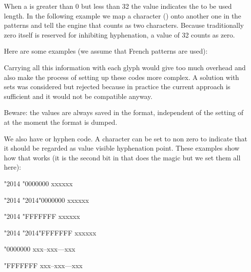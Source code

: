 When a \type {\hjcode} is greater than 0 but less than 32 the value indicates the
to be used length. In the following example we map a character () onto
another one in the patterns and tell the engine that  counts as two
characters. Because traditionally zero itself is reserved for inhibiting
hyphenation, a value of 32 counts as zero.

Here are some examples (we assume that French patterns are used):

\starttabulate[||||]
\NC                                  \NC {} \NC {} \NC \NR
\NC {}              \NC {} \NC {} \NC \NR
\NC {}           \NC {} \NC {} \NC \NR
\NC {}           \NC {} \NC {}  \NC \NR
\NC {}               \NC {} \NC {} \NC \NR
\NC {} \NC {} \NC {}  \NC \NR
\stoptabulate

Carrying all this information with each glyph would give too much overhead and
also make the process of setting up these codes more complex. A solution with
\type {\hjcode} sets was considered but rejected because in practice the current
approach is sufficient and it would not be compatible anyway.

Beware: the values are always saved in the format, independent of the setting
of \type {\savinghyphcodes} at the moment the format is dumped.

We also have \type {\hccode} or hyphen code. A character can be set to non zero
to indicate that it should be regarded as value visible hyphenation point. These
examples show how that works (it is the second bit in \type {\hyphenationmode}
that does the magic but we set them all here):

\startbuffer
{\hsize 1mm \hccode"2014 \zerocount  \hyphenationmode "0000000 xxx\emdash xxx \par}
{\hsize 1mm \hccode"2014 "2014\relax \hyphenationmode "0000000 xxx\emdash xxx \par}

{\hsize 1mm \hccode"2014 \zerocount  \hyphenationmode "FFFFFFF xxx\emdash xxx \par}
{\hsize 1mm \hccode"2014 "2014\relax \hyphenationmode "FFFFFFF xxx\emdash xxx \par}

{\hyphenationmode "0000000 xxx--xxx---xxx \par}
{\hyphenationmode "FFFFFFF xxx--xxx---xxx \par}
\stopbuffer

